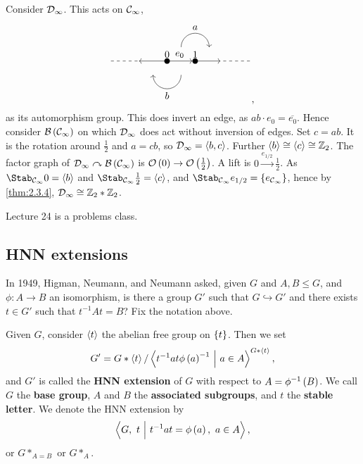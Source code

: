\begin{example}
Consider $ \mathcal{D}_\infty $. This acts on $ \mathcal{C}_\infty $,
$$
\begin{tikzpicture}
\fill (0, 0) circle (0.1) node[above]{$ 0 $};
\fill (1, 0) circle (0.1) node[above]{$ 1 $};
\draw [dashed] (-2, 0) to (-1, 0);
\draw [->] (0, 0) to (-1, 0);
\draw [->] (0, 0) to node[above]{$ e_0 $} (0.9, 0);
\draw [->] (1, 0) to (1.9, 0);
\draw [dashed] (2, 0) to (3, 0);
\draw [->] (0.5, 0.5) arc (180:0:0.5);
\draw [->] (0.5, -0.5) arc (0:-180:0.5);
\fill (1, 1) node[above]{$ a $};
\fill (0, -1) node[below]{$ b $};
\end{tikzpicture},
$$
as its automorphism group. This does invert an edge, as $ ab \cdot e_0 = \overline{e_0} $. Hence consider $ \BBB\br{\CCC_\infty} $ on which $ \mathcal{D}_\infty $ does act without inversion of edges. Set $ c = ab $. It is the rotation around $ \tfrac{1}{2} $ and $ a = cb $, so $ \mathcal{D}_\infty = \left\langle b, c \right\rangle $. Further $ \left\langle b \right\rangle \cong \left\langle c \right\rangle \cong \mathbb{Z}_2 $. The factor graph of $ \DDD_\infty \curvearrowright \BBB\br{\CCC_\infty} $ is $ \OOO\br{0} \to \OOO\br{\tfrac{1}{2}} $. A lift is $ 0 \xrightarrow{e_{1 / 2}} \tfrac{1}{2} $. As $ \Stab_{\CCC_\infty} 0 = \abr{b} $ and $ \Stab_{\CCC_\infty} \tfrac{1}{2} = \abr{c} $, and $ \Stab_{\CCC_\infty} e_{1 / 2} = \cbr{e_{\CCC_\infty}} $, hence by \ref{thm:2.3.4}, $ \mathcal{D}_\infty \cong \mathbb{Z}_2 * \mathbb{Z}_2 $.
\end{example}


Lecture 24 is a problems class.

\pagebreak

\subsection{HNN extensions}


In 1949, Higman, Neumann, and Neumann asked, given $ G $ and $ A, B \le G $, and $ \phi : A \to B $ an isomorphism, is there a group $ G' $ such that $ G \hookrightarrow G' $ and there exists $ t \in G' $ such that $ t^{-1}At = B $? Fix the notation above.

\begin{definition}
Given $ G $, consider $ \left\langle t \right\rangle $ the abelian free group on $ \cbr{t} $. Then we set
$$ G' = G * \abr{t} / \abr{t^{-1}at\phi\br{a}^{-1} \st a \in A}^{G * \abr{t}}, $$
and $ G' $ is called the \textbf{HNN extension} of $ G $ with respect to $ A = \phi^{-1}\br{B} $. We call $ G $ the \textbf{base group}, $ A $ and $ B $ the \textbf{associated subgroups}, and $ t $ the \textbf{stable letter}. We denote the HNN extension by
$$ \abr{G, \ t \st t^{-1}at = \phi\br{a}, \ a \in A}, $$
or $ G *_{A = B} $ or $ G *_A $.
\end{definition}

